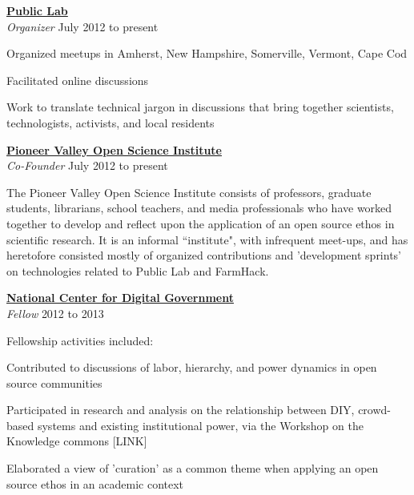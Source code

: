 \documentclass[10pt]{article}
\newcommand{\blankline}{\quad\pagebreak[3]}
\newcommand{\halfblankline}{\quad\vspace{-0.5\baselineskip}\pagebreak[3]}
\begin{document}
\href{http://publiclab.org}{\textbf{Public Lab}}  \\
\emph{Organizer} \hfill {July 2012 to present}

\halfblankline
\begin{innerlist}
\item Organized meetups in Amherst, New Hampshire, Somerville, Vermont, Cape Cod
\item Facilitated online discussions
\item Work to translate technical jargon in discussions that bring together scientists, technologists, activists, and local residents
\end{innerlist}
   

\blankline

\href{http://pvos.org}{\textbf{Pioneer Valley Open Science Institute}}  \\
\emph{Co-Founder} \hfill {July 2012 to present}

\halfblankline

The Pioneer Valley Open Science Institute consists of professors, graduate students, librarians, school teachers, and media professionals who have worked together to develop and reflect upon the application of an open source ethos in scientific research.  It is an informal ``institute", with infrequent meet-ups, and has heretofore consisted mostly of organized contributions and 'development sprints' on technologies related to Public Lab and FarmHack.  

\blankline

\href{http://www.umass.edu/digitalcenter/}{\textbf{National Center for Digital Government}}\\
\emph{Fellow} \hfill {2012 to 2013}

\halfblankline

Fellowship activities included:

\begin{innerlist}
\item Contributed to discussions of labor, hierarchy, and power dynamics in open source communities
\item Participated in research and analysis on the relationship between DIY, crowd-based systems and existing institutional power, via the Workshop on the Knowledge commons [LINK]
\item Elaborated a view of 'curation' as a common theme when applying an open source ethos in an academic context
\end{innerlist}
   
\end{document}
